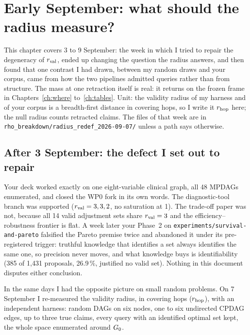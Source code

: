\chapter{Early September: what should the radius measure?}
\label{ch:redefinition}

This chapter covers 3 to 9 September: the week in which I tried to repair the degeneracy of $r_{\mathrm{val}}$, ended
up changing the question the radius answers, and then found that one contrast I had drawn, between my random
draws and your corpus, came from how the two pipelines admitted queries rather than from structure. The mass at
one retraction itself is real: it returns on the frozen frame in Chapters~\ref{ch:where} to~\ref{ch:tables}.
Unit: the validity radius of my harness and of your corpus is a breadth-first distance in covering hops, so I
write it $r_{\mathrm{hop}}$ here; the null radius counts retracted claims. The files of that week are in \texttt{rho\_breakdown/radius\_redef\_2026-09-07/}
unless a path says otherwise.

\begin{antes}
\end{antes}

\section{After 3 September: the defect I set out to repair}

Your deck worked exactly on one eight-variable clinical graph, all 48 MPDAGs enumerated, and closed the WP0
fork in its own words. The diagnostic-tool branch was supported ($r_{\mathrm{val}} = 3,
3, 2$, no saturation at 1). The trade-off paper was not, because all 14 valid adjustment sets share $r_{\mathrm{val}} = 3$
and the efficiency--robustness frontier is flat. A week later your Phase~2 on
\texttt{experiments/survival-and-pareto} falsified the Pareto premise twice and abandoned it under its
pre-registered trigger: truthful knowledge that identifies a set always identifies the same one, so precision
never moves, and what knowledge buys is identifiability (385 of 1,431 proposals, 26.9\,\%, justified no valid
set). Nothing in this document disputes either conclusion.

In the same days I had the opposite picture on small random problems. On 7 September I re-measured the validity radius, in covering hops ($r_{\mathrm{hop}}$),
with an independent harness: random DAGs on six nodes, one to six undirected CPDAG edges, up to three true
claims, every query with an identified optimal set kept, the whole space enumerated around $G_0$.

